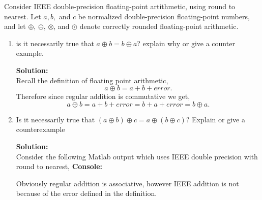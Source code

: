 \documentclass[12pt]{article}
\makeatletter
\theoremstyle{homework}
\newenvironment{exercise}[1]
{\def\@currentlabel{#1}\exercisecore}
{\endexercisecore}
\newcommand{\localhead}[1]{\par\smallskip\noindent\textbf{#1}\nobreak\\}%
\newcommand\solution{\localhead{Solution:}}
\makeatother
\begin{document}
\vspace{.5in}









\begin{exercise} {Problem 5.9} Consider IEEE double-precision floating-point artithmetic,
  using round to nearest. Let $a, b,$ and $c$ be normalized double-precision floating-point
  numbers, and let $\oplus$, $\ominus$, $\otimes$, and $\oslash$ denote correctly rounded floating-point 
  arithmetic.\\

  \begin{enumerate}
  \item is it necessarily true that $a\oplus b = b\oplus a$? explain why or give a counter example.
  \solution
  Recall the definition of floating point arithmetic,
  \begin{equation*}
    a\oplus b = a + b + error.
  \end{equation*}
  Therefore since regular addition is commutative we get,
  \begin{equation*}
    a\oplus b = a + b + error = b + a + error = b\oplus a.
  \end{equation*}
  \vspace{.25in}


\item Is it necessarily true that  $(a\oplus b )\oplus c = a\oplus (b \oplus c)  $? Explain or give a counterexample\\
\solution
Consider the following Matlab output which uses IEEE double precision with round to nearest,
\textbf{Console:}

Obviously regular addition is associative, however IEEE addition is not because of the error defined in the definition.

\vspace{.25in}





\end{enumerate}
\end{exercise}
\end{document}
